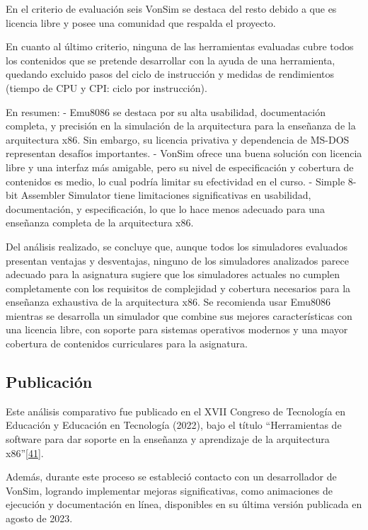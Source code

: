 \documentclass[12pt,oneside]{templates/unerthesis}
\begin{document}
En el criterio de evaluación seis VonSim se destaca del resto debido a que es licencia libre y posee una comunidad que respalda el proyecto.

En cuanto al último criterio, ninguna de las herramientas evaluadas cubre todos los contenidos que se pretende desarrollar con la ayuda de una herramienta, quedando excluido pasos del ciclo de instrucción y medidas de rendimientos (tiempo de CPU y CPI: ciclo por instrucción).

En resumen:
- Emu8086 se destaca por su alta usabilidad, documentación completa, y precisión en la simulación de la arquitectura para la enseñanza de la arquitectura x86. Sin embargo, su licencia privativa y dependencia de MS-DOS representan desafíos importantes.
- VonSim ofrece una buena solución con licencia libre y una interfaz más amigable, pero su nivel de especificación y cobertura de contenidos es medio, lo cual podría limitar su efectividad en el curso.
- Simple 8-bit Assembler Simulator tiene limitaciones significativas en usabilidad, documentación, y especificación, lo que lo hace menos adecuado para una enseñanza completa de la arquitectura x86.

Del análisis realizado, se concluye que, aunque todos los simuladores evaluados presentan ventajas y desventajas, ninguno de los simuladores analizados parece adecuado para la asignatura sugiere que los simuladores actuales no cumplen completamente con los requisitos de complejidad y cobertura necesarios para la enseñanza exhaustiva de la arquitectura x86. Se recomienda usar Emu8086 mientras se desarrolla un simulador que combine sus mejores características con una licencia libre, con soporte para sistemas operativos modernos y una mayor cobertura de contenidos curriculares para la asignatura.

\hypertarget{publicaciuxf3n}{%
\subsection{Publicación}\label{publicaciuxf3n}}

Este análisis comparativo fue publicado en el XVII Congreso de Tecnología en Educación y Educación en Tecnología (2022), bajo el título ``Herramientas de software para dar soporte en la enseñanza y aprendizaje de la arquitectura x86''\protect\hyperlink{ref-colombani_herramientas_2022}{{[}41{]}}.

Además, durante este proceso se estableció contacto con un desarrollador de VonSim, logrando implementar mejoras significativas, como animaciones de ejecución y documentación en línea, disponibles en su última versión publicada en agosto de 2023.
\end{document}

